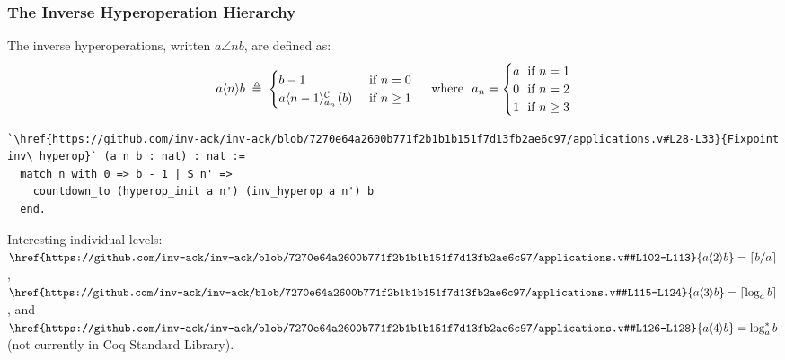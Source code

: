 \begin{frame}[fragile]
\frametitle{The Inverse Hyperoperation Hierarchy}
The inverse hyperoperations, written $a\angle{n}b$, are defined as:
\begin{equation*}
a\angle{n}b \; \triangleq \; \begin{cases}
b - 1 & \text{ if } n = 0 \\
\cdt{a\angle{n-1}}{a_n}(b) & \text{ if } n \ge 1
\end{cases}
\quad \text{ where } \ a_n = \begin{cases}
a & \hspace{-7pt}\text{ if } n = 1 \\
0 & \hspace{-7pt}\text{ if } n = 2 \\
1 & \hspace{-7pt}\text{ if } n \ge 3
\end{cases}
\end{equation*}
\begin{lstlisting}
`\href{https://github.com/inv-ack/inv-ack/blob/7270e64a2600b771f2b1b1b151f7d13fb2ae6c97/applications.v#L28-L33}{Fixpoint inv\_hyperop}` (a n b : nat) : nat :=
  match n with 0 => b - 1 | S n' =>
    countdown_to (hyperop_init a n') (inv_hyperop a n') b
  end.
\end{lstlisting}

\smallskip

Interesting individual levels:
$\href{https://github.com/inv-ack/inv-ack/blob/7270e64a2600b771f2b1b1b151f7d13fb2ae6c97/applications.v#L102-L113}{a\angle{2}b}
= \left\lceil b/a \right\rceil$,
$\href{https://github.com/inv-ack/inv-ack/blob/7270e64a2600b771f2b1b1b151f7d13fb2ae6c97/applications.v#L115-L124}{a\angle{3}b}
= \left\lceil \log_a b \right\rceil$, and
$\href{https://github.com/inv-ack/inv-ack/blob/7270e64a2600b771f2b1b1b151f7d13fb2ae6c97/applications.v#L126-L128}{a\angle{4}b}
= \log^*_a b$ (not currently in Coq Standard Library).
\end{frame}


